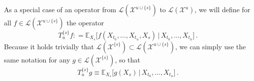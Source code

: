 \documentclass[a4paper,reqno]{amsart}
\newcommand{\states}{\mathcal{X}}
\newcommand{\gambles}{\mathcal{L}}
\newcommand{\coloneqq}{:\!=}
\begin{document}

As a special case of an operator from $\gambles(\states^{u\cup\{s\}})$ to $\gambles(\states^u)$, we will define for all $f\in\gambles(\states^{u\cup\{s\}})$ the operator
\begin{equation*}
T_u^{\{s\}}f \coloneqq \mathbb{E}_{X_{s}}\bigl[f(X_{t_0},\ldots,X_{t_n},X_s)\,\vert\,X_{t_0},\ldots,X_{t_n}\bigr]\,.
\end{equation*}
Because it holds trivially that $\gambles(\states^{\{s\}})\subset \gambles(\states^{u\cup\{s\}})$, we can simply use the same notation for any $g\in\gambles(\states^{\{s\}})$, so that
\begin{equation*}
T_u^{\{s\}}g \equiv \mathbb{E}_{X_s}\bigl[g(X_s)\,\vert\,X_{t_0},\ldots,X_{t_n}\bigr]\,.
\end{equation*}
\end{document}
